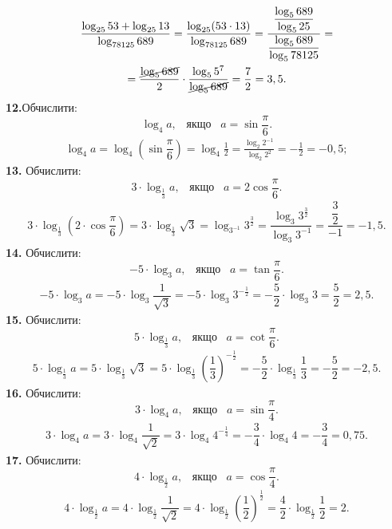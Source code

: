 \begin{multline*}
\dfrac{\log_{25}53+\log_{25}13}{\log_{78125}{689}}=
\dfrac{\log_{25}(53\cdot13)}{\log_{78125}689}=
\dfrac{\dfrac{\log_{5}689}{\log_{5}25}}{\dfrac{\log_{5}689}{\log_{5}78125}}=\\
=\dfrac{\cancel{\log_{5}689}}{2}\cdot\dfrac{\log_{5}5^7}{\cancel{\log_{5}689}}=
\dfrac{7}{2}=3,5.
\end{multline*}
\textbf{12.}Обчислити:
$$
\log_4 a, \;\;\; \mbox{якщо} \;\;\; a=\sin\dfrac{\pi}{6}.
$$
\begin{gather*}
\log_{4}a=
\log_{4}\left(\sin\dfrac{\pi}{6}\right)=
\log_4 \frac{1}{2} =
\frac{\log_2 2^{-1}}{\log_2 2^2}=
-\frac{1}{2} = -0,5;
\end{gather*}
\textbf{13.} Обчислити:
$$
3\cdot\log_{\frac{1}{3}}a, \;\;\; \mbox{якщо} \;\;\; a=2\cos\dfrac{\pi}{6}.
$$
\begin{gather*}
3\cdot\log_{\frac{1}{3}}\left(2\cdot\cos\dfrac{\pi}{6}\right)=
3\cdot\log_{\frac{1}{3}}\sqrt{3}=
\log_{3^{-1}}3^{\frac{3}{2}}=
\dfrac{\log_{3}3^{\frac{3}{2}}}{\log_{3}3^{-1}}=
\dfrac{\dfrac{3}{2}}{-1}=-1,5.
\end{gather*}
\textbf{14.} Обчислити:
$$
-5\cdot\log_{3}a, \;\;\; \mbox{якщо} \;\;\; a=\tan\dfrac{\pi}{6}.
$$
\begin{gather*}
-5\cdot\log_{3}a=
-5\cdot\log_{3}\dfrac{1}{\sqrt{3}}=
-5\cdot\log_{3}3^{-\frac{1}{2}}=
-\dfrac{5}{2}\cdot\log_{3}3=\dfrac{5}{2}=2,5.
\end{gather*}
\textbf{15.} Обчислити:
$$
5\cdot\log_{\frac{1}{3}}a, \;\;\; \mbox{якщо} \;\;\; a=\cot\dfrac{\pi}{6}.
$$
\begin{gather*}
5\cdot\log_{\frac{1}{3}}a=
5\cdot\log_{\frac{1}{3}}\sqrt{3}=
5\cdot\log_{\frac{1}{3}}\left(\dfrac{1}{3}\right)^{-\frac{1}{2}}=
-\dfrac{5}{2}\cdot\log_{\frac{1}{3}}\dfrac{1}{3}=
-\dfrac{5}{2}=-2,5.
\end{gather*}
\textbf{16.} Обчислити:
$$
3\cdot\log_{4}a, \;\;\; \mbox{якщо} \;\;\; a=\sin\dfrac{\pi}{4}.
$$
\begin{gather*}
3\cdot\log_{4}a=
3\cdot\log_{4}\dfrac{1}{\sqrt{2}}=
3\cdot\log_{4}4^{-\frac{1}{4}}=
-\dfrac{3}{4}\cdot\log_{4}4=
-\dfrac{3}{4}=0,75.
\end{gather*}
\textbf{17.} Обчислити:
$$
4\cdot\log_{\frac{1}{2}}a, \;\;\; \mbox{якщо} \;\;\; a=\cos\dfrac{\pi}{4}.
$$
\begin{gather*}
4\cdot\log_{\frac{1}{2}}a=
4\cdot\log_{\frac{1}{2}}\dfrac{1}{\sqrt{2}}=
4\cdot\log_{\frac{1}{2}}\left(\dfrac{1}{2}\right)^{\frac{1}{2}}=
\dfrac{4}{2}\cdot\log_{\frac{1}{2}}\dfrac{1}{2}=2.
\end{gather*}
